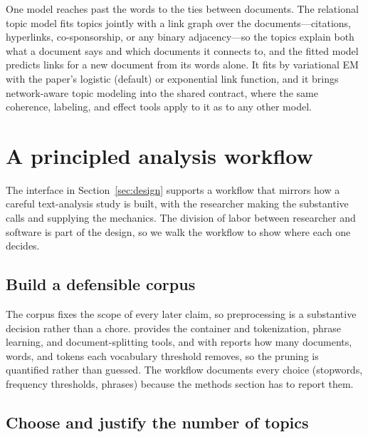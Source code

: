 \documentclass[article]{jss}
\begin{document}
One model reaches past the words to the ties between documents. The relational
topic model \citep[;][]{chang2010rtm} fits topics jointly with a link
graph over the documents---citations, hyperlinks, co-sponsorship, or any binary
adjacency---so the topics explain both what a document says and which documents
it connects to, and the fitted model predicts links for a new document from its
words alone. It fits by variational EM with the paper's logistic (default) or
exponential link function, and it brings network-aware topic modeling into the
shared contract, where the same coherence, labeling, and effect tools apply to it
as to any other model.

\section{A principled analysis workflow}\label{sec:workflow}

The interface in Section~\ref{sec:design} supports a workflow that mirrors how a
careful text-analysis study is built, with the researcher making the
substantive calls and  supplying the mechanics. The division of labor
between researcher and software is part of the design, so we walk the workflow to
show where each one decides.

\subsection{Build a defensible corpus}

The corpus fixes the scope of every later claim, so preprocessing is a
substantive decision rather than a chore.  provides the 
container and tokenization, phrase learning, and document-splitting tools, and
 with  reports how many
documents, words, and tokens each vocabulary threshold removes, so the pruning is
quantified rather than guessed. The workflow documents every choice (stopwords,
frequency thresholds, phrases) because the methods section has to report them.

\subsection{Choose and justify the number of topics}
\end{document}
